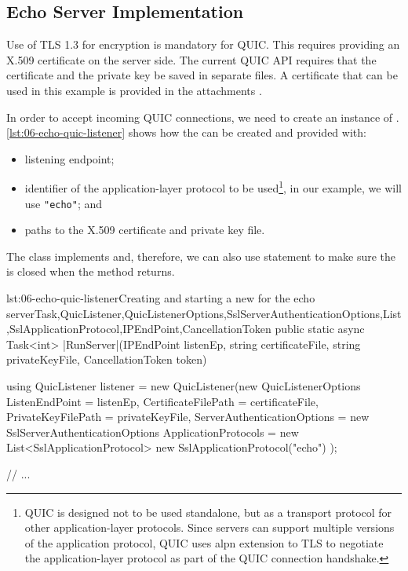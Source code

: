 
\subsection{Echo Server Implementation}

Use of TLS 1.3 for encryption is mandatory for QUIC. This requires providing an X.509 certificate on
the server side. The current QUIC API requires that the certificate and the private key be saved in
separate files. A certificate that can be used in this example is provided in the attachments
. 

In order to accept incoming QUIC connections, we need to create an instance of \QuicListener{}.
\autoref{lst:06-echo-quic-listener} shows how the \QuicListener{} can be created and provided with:

\begin{itemize}

  \item listening endpoint;

  \item identifier of the application-layer protocol to be used\footnote{QUIC is designed not to be used standalone, but as a transport protocol for other application-layer protocols. Since servers can support multiple versions of the application protocol, QUIC uses \gls{alpn} extension to TLS to negotiate the application-layer protocol as part of the QUIC connection handshake.}, in our example, we will use \texttt{"echo"}; and

  \item paths to the X.509 certificate and private key file.

\end{itemize}

The \QuicListener{} class implements  and, therefore, we can also use
 statement to make sure the \QuicListener{} is closed when the method returns.

\begin{myListingCsharp}{lst:06-echo-quic-listener}{Creating and starting a new \QuicListener{} for the echo server}{Task,QuicListener,QuicListenerOptions,SslServerAuthenticationOptions,List,SslApplicationProtocol,IPEndPoint,CancellationToken}{}
public static async Task<int> |RunServer|(IPEndPoint listenEp,
    string certificateFile, string privateKeyFile, CancellationToken token)
{
    using QuicListener listener = new QuicListener(new QuicListenerOptions
    {
        ListenEndPoint = listenEp,
        CertificateFilePath = certificateFile,
        PrivateKeyFilePath = privateKeyFile,
        ServerAuthenticationOptions = new SslServerAuthenticationOptions
        {
            ApplicationProtocols = new List<SslApplicationProtocol>
            {
                new SslApplicationProtocol("echo")
            }
        }
    });

    // ...
}
\end{myListingCsharp}

